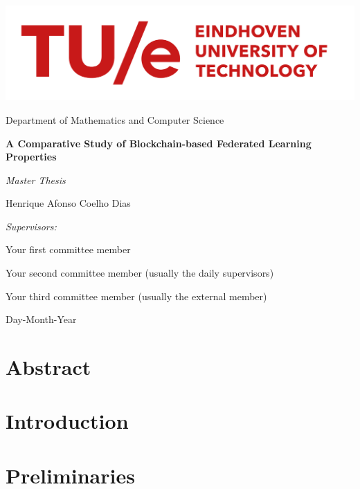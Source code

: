 \documentclass[12pt,a4paper,oneside]{book}
\begin{document}

\begin{titlepage}
\centering
\includegraphics[width=0.7\linewidth]{graphics/tue-logo.png}\par
Department of Mathematics and Computer Science

\vspace{3cm}
{\LARGE\textbf{A Comparative Study of Blockchain-based Federated Learning Properties}}\par\vspace{0.5cm}
{\large\textit{Master Thesis}}\par\vspace{1cm}
{\large Henrique Afonso Coelho Dias}\par

\vfill

\emph{Supervisors:}\par
Your first committee member\par
Your second committee member (usually the daily supervisors)\par
Your third committee member (usually the external member)\par

\vspace{2cm}

{Day-Month-Year}

\end{titlepage}

\chapter*{Abstract}\label{chapter:abstract}


\tableofcontents

\listoffigures

\listoftables

\chapter{Introduction}\label{chapter:introduction}


\chapter{Preliminaries}\label{chapter:preliminaries}

\end{document}
